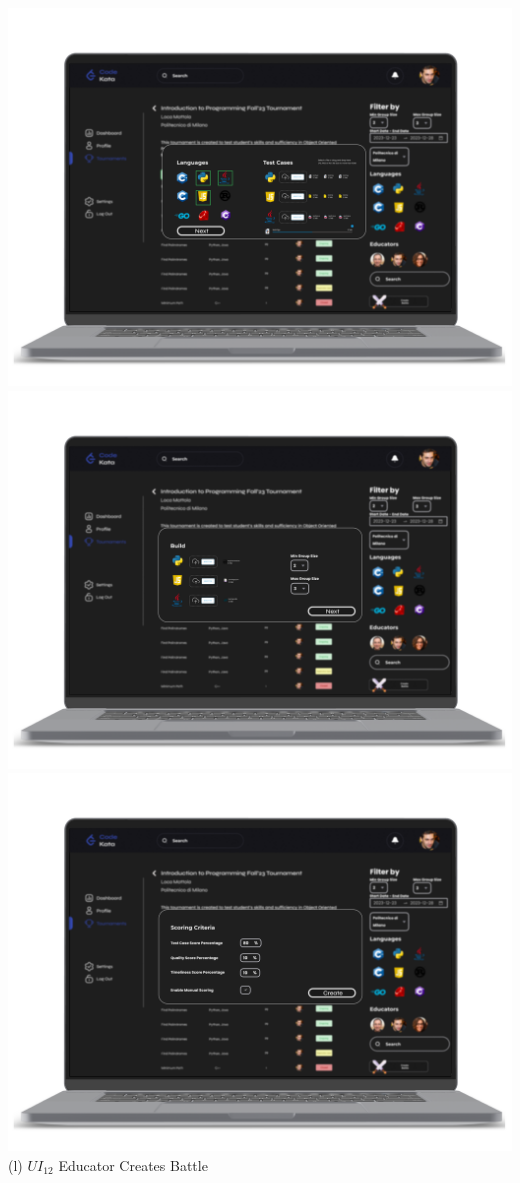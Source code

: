 \begin{center}
\includegraphics[scale=0.13]{Images/ui-ux/educator_creates_battle_4.png}
\includegraphics[scale=0.13]{Images/ui-ux/educator_creates_battle_5.png}
\includegraphics[scale=0.13]{Images/ui-ux/educator_creates_battle_6.png}
        (l) $UI_{12}$ Educator Creates Battle
\end{center}

